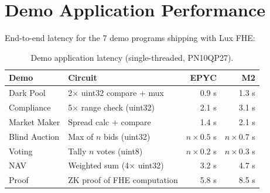 \section{Demo Application Performance}


End-to-end latency for the 7 demo programs shipping with Lux FHE:

\begin{table}[h]
\centering
\small
\begin{tabular}{@{}llrr@{}}
\toprule
\textbf{Demo} & \textbf{Circuit} & \textbf{EPYC} & \textbf{M2} \\
\midrule
Dark Pool & 2$\times$ uint32 compare + mux & 0.9 s & 1.3 s \\
Compliance & 5$\times$ range check (uint32) & 2.1 s & 3.1 s \\
Market Maker & Spread calc + compare & 1.4 s & 2.1 s \\
Blind Auction & Max of $n$ bids (uint32) & $n \times 0.5$ s & $n \times 0.7$ s \\
Voting & Tally $n$ votes (uint8) & $n \times 0.2$ s & $n \times 0.3$ s \\
NAV & Weighted sum (4$\times$ uint32) & 3.2 s & 4.7 s \\
Proof & ZK proof of FHE computation & 5.8 s & 8.5 s \\
\bottomrule
\end{tabular}
\caption{Demo application latency (single-threaded, PN10QP27).}
\label{tab:demos}
\end{table}

